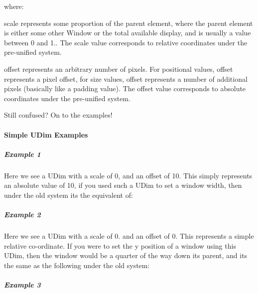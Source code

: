 where\+: \begin{DoxyItemize}
\item {\ttfamily \textquotesingle{}scale\textquotesingle{}} represents some proportion of the parent element, where the parent element is either some other Window or the total available display, and is usually a value between 0 and 1.. The scale value corresponds to relative coordinates under the pre-\/unified system. \item {\ttfamily \textquotesingle{}offset\textquotesingle{}} represents an arbitrary number of pixels. For positional values, offset represents a pixel offset, for size values, offset represents a number of additional pixels (basically like a padding value). The offset value corresponds to absolute coordinates under the pre-\/unified system.\end{DoxyItemize}
Still confused? On to the examples!\hypertarget{fal_intro_fal_udim_examples}{}\paragraph{Simple U\+Dim Examples}\label{fal_intro_fal_udim_examples}
\hypertarget{fal_intro_fal_udim_example1}{}\subparagraph{Example 1}\label{fal_intro_fal_udim_example1}

\begin{DoxyCode}{0}
\end{DoxyCode}
 Here we see a U\+Dim with a scale of 0, and an offset of 10. This simply represents an absolute value of 10, if you used such a U\+Dim to set a window width, then under the old system it\textquotesingle{}s the equivalent of\+: 
\begin{DoxyCode}{0}
\end{DoxyCode}
\hypertarget{fal_intro_fal_udim_example2}{}\subparagraph{Example 2}\label{fal_intro_fal_udim_example2}

\begin{DoxyCode}{0}
\end{DoxyCode}
 Here we see a U\+Dim with a scale of 0. and an offset of 0. This represents a simple relative co-\/ordinate. If you were to set the y position of a window using this U\+Dim, then the window would be a quarter of the way down it\textquotesingle{}s parent, and it\textquotesingle{}s the same as the following under the old system\+: 
\begin{DoxyCode}{0}
\end{DoxyCode}
\hypertarget{fal_intro_fal_udim_example3}{}\subparagraph{Example 3}\label{fal_intro_fal_udim_example3}

